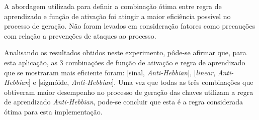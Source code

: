 \documentclass[12pt]{article}
\begin{document}
                
                
                
            
                

                A abordagem utilizada para definir a combinação ótima entre regra de aprendizado e função de ativação foi atingir a maior eficiência possível no processo de geração. Não foram levados em consideração fatores como precauções com relação a prevenções de ataques ao processo.
                
                
                Analisando os resultados obtidos neste experimento, pôde-se afirmar que, para esta aplicação, as 3 combinações de função de ativação e regra de aprendizado que se mostraram mais eficiente foram: [sinal, \textit{Anti-Hebbian}], [\textit{linear}, \textit{Anti-Hebbian}] e [sigmóide, \textit{Anti-Hebbian}]. Uma vez que todas as três combinações que obtiveram maior desempenho no processo de geração das chaves utilizam a regra de aprendizado \textit{Anti-Hebbian}, pode-se concluir que esta é a regra considerada ótima para esta implementação.
                
                
\end{document}
